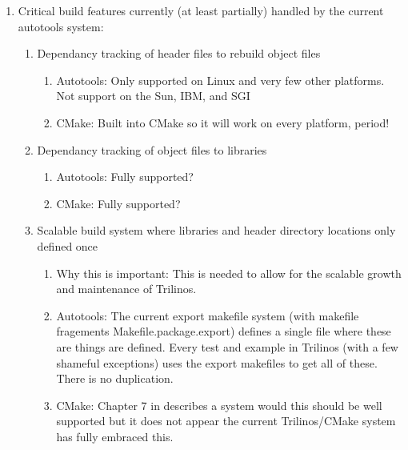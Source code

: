 \documentclass[pdf,ps2pdf,11pt]{SANDreport}
\begin{document}
\begin{enumerate}

{}\item Critical build features currently (at least partially) handled
by the current autotools system:

  \begin{enumerate}

  {}\item Dependancy tracking of header files to rebuild object files

    \begin{enumerate}

    {}\item Autotools: Only supported on Linux and very few other
    platforms.  Not support on the Sun, IBM, and SGI

    {}\item CMake: Built into CMake so it will work on every platform,
    period!

    \end{enumerate}

  {}\item Dependancy tracking of object files to libraries

    \begin{enumerate}

    {}\item Autotools: Fully supported?

    {}\item CMake: Fully supported?

    \end{enumerate}

  {}\item Scalable build system where libraries and header directory
  locations only defined once

    \begin{enumerate}

    {}\item Why this is important: This is needed to allow for the
    scalable growth and maintenance of Trilinos.

    {}\item Autotools: The current export makefile system (with
    makefile fragements Makefile.package.export) defines a single file
    where these are things are defined.  Every test and example in
    Trilinos (with a few shameful exceptions) uses the export
    makefiles to get all of these.  There is no duplication.

    {}\item CMake: Chapter 7 in {}\cite{MasteringCMake_fourth}
    describes a system would this should be well supported but it does
    not appear the current Trilinos/CMake system has fully embraced
    this.


\end{enumerate}
\end{enumerate}
\end{enumerate}
\end{document}
